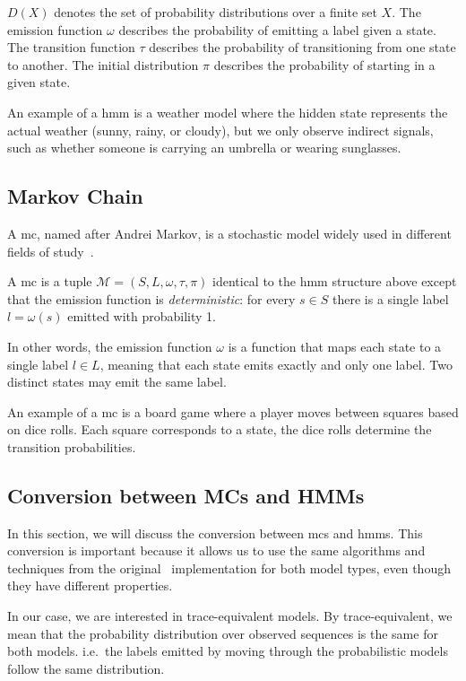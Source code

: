 $D(X)$ denotes the set of probability distributions over a finite set $X$.
The emission function $\omega$ describes the probability of emitting a label given a state.
The transition function $\tau$ describes the probability of transitioning from one state to another.
The initial distribution $\pi$ describes the probability of starting in a given state.

An example of a \gls{hmm} is a weather model where the hidden state represents the actual weather (sunny, rainy, or cloudy), but we only observe indirect signals, such as whether someone is carrying an umbrella or wearing sunglasses.

\subsection{Markov Chain}\label{subsec:mc}
A \gls{mc}, named after Andrei Markov, is a stochastic model widely used in different fields of study~\cite{baum1966statistical}.


\begin{definition}
    A \gls{mc} is a tuple $\mathcal{M} = (S, L, \omega, \tau, \pi)$ identical to the \gls{hmm} structure above except that the emission function is \emph{deterministic}: for every $s\in S$ there is a single label
    $l=\omega(s)$ emitted with probability 1.
\end{definition}


In other words, the emission function $\omega$ is a function that maps each state to a single label $l \in L$, meaning that each state emits exactly and only one label.
Two distinct states may emit the same label.

An example of a \gls{mc} is a board game where a player moves between squares based on dice rolls.
Each square corresponds to a state, the dice rolls determine the transition probabilities.

\subsection{Conversion between MCs and HMMs}\label{subsec:mc_hmm_conversion}
In this section, we will discuss the conversion between \glspl{mc} and \glspl{hmm}.
This conversion is important because it allows us to use the same algorithms and techniques from the original \Cupaal\ implementation for both model types, even though they have different properties.

In our case, we are interested in trace-equivalent models.
By trace-equivalent, we mean that the probability distribution over observed sequences is the same for both models.
i.e.\ the labels emitted by moving through the probabilistic models follow the same distribution.

